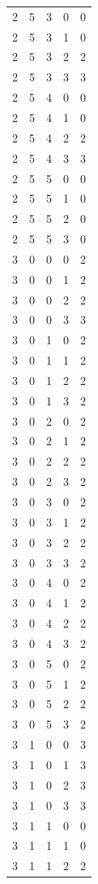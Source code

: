 \begin{longtable}{rrrrr}
2 & 5 & 3 & 0 & 0 \\
2 & 5 & 3 & 1 & 0 \\
2 & 5 & 3 & 2 & 2 \\
2 & 5 & 3 & 3 & 3 \\
2 & 5 & 4 & 0 & 0 \\
2 & 5 & 4 & 1 & 0 \\
2 & 5 & 4 & 2 & 2 \\
2 & 5 & 4 & 3 & 3 \\
2 & 5 & 5 & 0 & 0 \\
2 & 5 & 5 & 1 & 0 \\
2 & 5 & 5 & 2 & 0 \\
2 & 5 & 5 & 3 & 0 \\
3 & 0 & 0 & 0 & 2 \\
3 & 0 & 0 & 1 & 2 \\
3 & 0 & 0 & 2 & 2 \\
3 & 0 & 0 & 3 & 3 \\
3 & 0 & 1 & 0 & 2 \\
3 & 0 & 1 & 1 & 2 \\
3 & 0 & 1 & 2 & 2 \\
3 & 0 & 1 & 3 & 2 \\
3 & 0 & 2 & 0 & 2 \\
3 & 0 & 2 & 1 & 2 \\
3 & 0 & 2 & 2 & 2 \\
3 & 0 & 2 & 3 & 2 \\
3 & 0 & 3 & 0 & 2 \\
3 & 0 & 3 & 1 & 2 \\
3 & 0 & 3 & 2 & 2 \\
3 & 0 & 3 & 3 & 2 \\
3 & 0 & 4 & 0 & 2 \\
3 & 0 & 4 & 1 & 2 \\
3 & 0 & 4 & 2 & 2 \\
3 & 0 & 4 & 3 & 2 \\
3 & 0 & 5 & 0 & 2 \\
3 & 0 & 5 & 1 & 2 \\
3 & 0 & 5 & 2 & 2 \\
3 & 0 & 5 & 3 & 2 \\
3 & 1 & 0 & 0 & 3 \\
3 & 1 & 0 & 1 & 3 \\
3 & 1 & 0 & 2 & 3 \\
3 & 1 & 0 & 3 & 3 \\
3 & 1 & 1 & 0 & 0 \\
3 & 1 & 1 & 1 & 0 \\
3 & 1 & 1 & 2 & 2 \\

\end{longtable}
